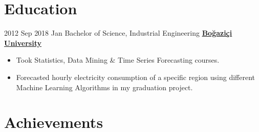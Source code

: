 \documentclass[letterpaper]{DS_class_file} %
\begin{document}
\section{Education}

\begin{twenty} %

   	\twentyitem
	    {2012 Sep}
	    {2018 Jan}
	    {\hspace{0.2cm}Bachelor of Science, Industrial Engineering}
	    {\href{http://www.ie.boun.edu.tr/}{\hspace{0.27cm} \textbf{Boğaziçi University} }}
	    {}
	    {\begin{itemize}
			\item Took Statistics, Data Mining \& Time Series Forecasting courses.
			\item Forecasted hourly electricity consumption of a specific region using different Machine Learning Algorithms in my graduation project.

		\end{itemize}} 
\end{twenty}


\section{Achievements}
\end{document}

